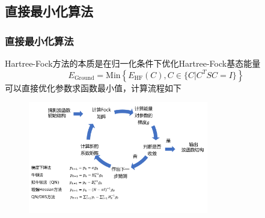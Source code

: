 \documentclass[10pt,aspectratio=43,mathserif,UTF8]{beamer}
\begin{document}
\subsection{直接最小化算法}
\begin{frame}
	\frametitle{直接最小化算法}
	Hartree-Fock方法的本质是在归一化条件下优化Hartree-Fock基态能量
	\begin{equation}
	E_{\text{Ground}}=\text{Min}\left \{ E_{\text{HF}}(C), C \in  \{C| C^TSC=I  \} \right \}
	\end{equation}
	可以直接优化参数求函数最小值，计算流程如下

	\begin{figure}[htbp]
		\centering
		\includegraphics[width=0.7\textwidth]{figure/HF/QN2.png}
	\end{figure}


	
\end{frame}
\end{document}
